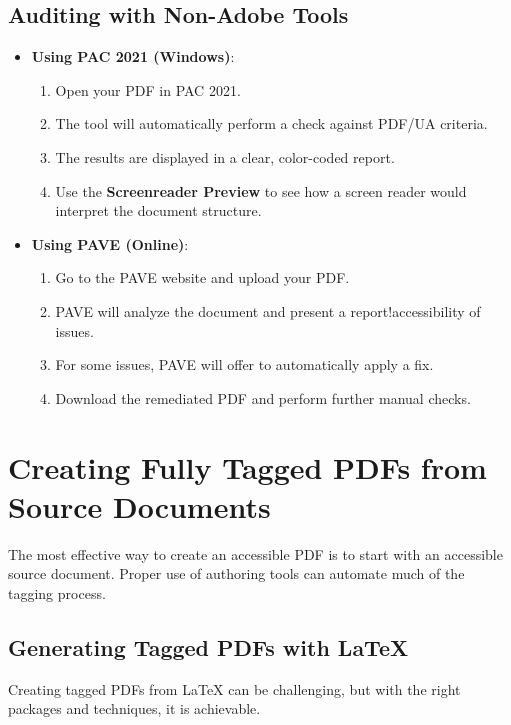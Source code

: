 \subsection{Auditing with Non-Adobe Tools}
\label{subsec:auditing-non-adobe}
\begin{itemize}
	\item \textbf{Using PAC 2021 (Windows)}:
	      \begin{enumerate}
		      \item Open your PDF in PAC 2021.
		      \item The tool will automatically perform a check against PDF/UA criteria.
		      \item The results are displayed in a clear, color-coded report.
		      \item Use the \textbf{Screenreader Preview} to see how a screen reader would interpret the document structure.
	      \end{enumerate}
	\item \textbf{Using PAVE (Online)}:
	      \begin{enumerate}
		      \item Go to the PAVE website and upload your PDF.
		      \item PAVE will analyze the document and present a report!accessibility of issues.
		      \item For some issues, PAVE will offer to automatically apply a fix.
		      \item Download the remediated PDF and perform further manual checks.
	      \end{enumerate}
\end{itemize}

\section{Creating Fully Tagged PDFs from Source Documents}
\label{sec:creating-tagged-pdfs}
The most effective way to create an accessible PDF is to start with an accessible source document. Proper use of authoring tools can automate much of the tagging process.

\subsection{Generating Tagged PDFs with LaTeX}
\label{subsec:tagged-pdfs-latex}
Creating tagged PDFs from LaTeX can be challenging, but with the right packages and techniques, it is achievable.


